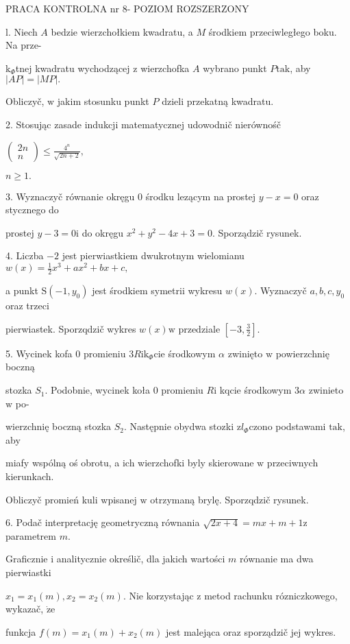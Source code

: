 \documentclass[a4paper,12pt]{article}
\begin{document}
PRACA KONTROLNA nr 8- POZIOM ROZSZERZONY

l. Niech $A$ bedzie wierzchołkiem kwadratu, a $M$ środkiem przeciwległego boku. Na prze-

$\mathrm{k}_{\Phi}$tnej kwadratu wychodzącej $\mathrm{z}$ wierzchofka $A$ wybrano punkt $P\mathrm{t}\mathrm{a}\mathrm{k}$, aby $|AP|=|MP|.$

Obliczyč, $\mathrm{w}$ jakim stosunku punkt $P$ dzieli przekatną kwadratu.

2. Stosując zasade indukcji matematycznej udowodnič nierównośč

$\left(\begin{array}{l}
2n\\
n
\end{array}\right) \displaystyle \leq\frac{4^{n}}{\sqrt{2n+2}},$

$n\geq 1.$

3. Wyznaczyč równanie okręgu $0$ środku lezącym na prostej $y-x=0$ oraz stycznego do

prostej $y-3=0\mathrm{i}$ do okręgu $x^{2}+y^{2}-4x+3=0$. Sporządzič rysunek.

4. Liczba $-2$ jest pierwiastkiem dwukrotnym wielomianu $w(x) = \displaystyle \frac{1}{2}x^{3}+ax^{2}+bx+c,$

a punkt $\mathrm{S}(-1,y_{0})$ jest środkiem symetrii wykresu $w(x)$. Wyznaczyč $a, b, c, y_{0}$ oraz trzeci

pierwiastek. Sporzqdzič wykres $w(x)\mathrm{w}$ przedziale $[-3,\displaystyle \frac{3}{2}].$

5. Wycinek kofa $0$ promieniu $3R\mathrm{i}\mathrm{k}_{\Phi}\mathrm{c}\mathrm{i}\mathrm{e}$ środkowym $\alpha$ zwinięto $\mathrm{w}$ powierzchnię boczną

stozka $S_{1}$. Podobnie, wycinek koła $0$ promieniu $R\mathrm{i}$ kqcie środkowym $ 3\alpha$ zwinieto $\mathrm{w}$ po-

wierzchnię boczną stozka $S_{2}$. Następnie obydwa stozki $\mathrm{z}l_{\Phi}$czono podstawami $\mathrm{t}\mathrm{a}\mathrm{k}$, aby

miafy wspólną oś obrotu, a ich wierzchofki byly skierowane $\mathrm{w}$ przeciwnych kierunkach.

Obliczyč promień kuli wpisanej $\mathrm{w}$ otrzymaną brylę. Sporzqdzič rysunek.

6. Podač interpretację geometryczną równania $\sqrt{2x+4}=mx+m+1\mathrm{z}$ parametrem $m.$

Graficznie $\mathrm{i}$ analitycznie określič, dla jakich wartości $m$ równanie ma dwa pierwiastki

$x_{1}=x_{1}(m), x_{2}=x_{2}(m)$. Nie korzystając $\mathrm{z}$ metod rachunku rózniczkowego, wykazač, $\dot{\mathrm{z}}\mathrm{e}$

funkcja $f(m)=x_{1}(m)+x_{2}(m)$ jest malejąca oraz sporządzič jej wykres.
\end{document}
